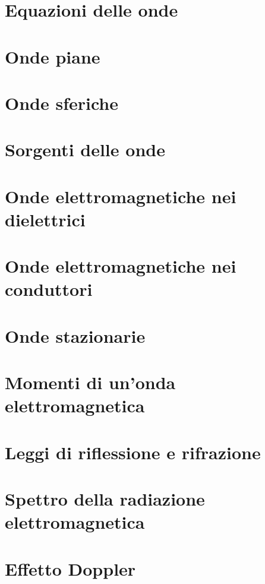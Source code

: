 \section{Equazioni delle onde}


\section{Onde piane}


\section{Onde sferiche}


\section{Sorgenti delle onde}


\section{Onde elettromagnetiche nei dielettrici}


\section{Onde elettromagnetiche nei conduttori}


\section{Onde stazionarie}


\section{Momenti di un'onda elettromagnetica}


\section{Leggi di riflessione e rifrazione}


\section{Spettro della radiazione elettromagnetica}


\section{Effetto Doppler}

